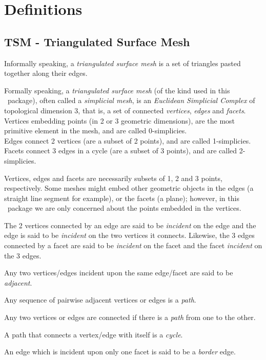 \section{Definitions\label{SurfaceMeshSimplification:SecDefinitions}}

\subsection{TSM - Triangulated Surface Mesh}

Informally speaking, a {\em triangulated surface mesh} is a set of triangles pasted together along their edges.

Formally speaking, a {\em triangulated surface mesh} (of the kind used in this \cgal\ package), often called a {\em simplicial mesh}, is an {\em Euclidean Simplicial Complex} of topological dimension 3, that is, a set of connected {\em vertices}, {\em edges} and {\em facets}.\\
Vertices embedding points (in 2 or 3 geometric dimensions), are the most primitive element in the mesh, and are called 0-simplicies.\\
Edges connect 2 vertices (are a subset of 2 points), and are called 1-simplicies.\\
Facets connect 3 edges in a cycle (are a subset of 3 points), and are called 2-simplicies.

Vertices, edges and facets are necessarily subsets of 1, 2 and 3 points, respectively. Some meshes might embed other geometric objects in the edges (a straight line segment for example), or the facets (a plane); however, in this \cgal\ package we are only concerned about the points embedded in the vertices.

The 2 vertices connected by an edge are said to be {\em incident} on the edge and the edge is said to be {\em incident} on the two vertices it connects. Likewise, the 3 edges connected by a facet are said to be {\em incident} on the facet and the facet {\em incident} on the 3 edges.

Any two vertices/edges incident upon the same edge/facet are said to be {\em adjacent}.

Any sequence of pairwise adjacent vertices or edges is a {\em path}.

Any two vertices or edges are connected if there is a {\em path} from one to the other.

A path that connects a vertex/edge with itself is a {\em cycle}.

An edge which is incident upon only one facet is said to be a {\em border} edge. 


